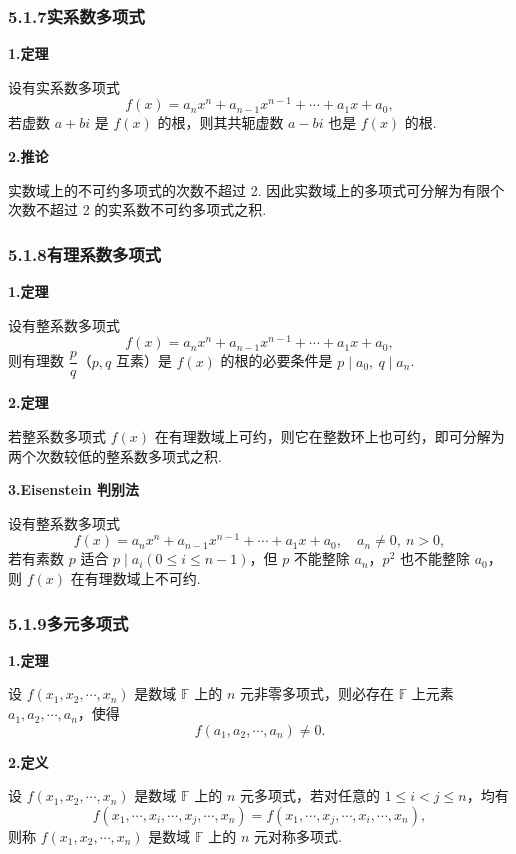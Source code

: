 \documentclass[UTF8, 12pt, fontset=fandol, oneside]{ctexart}
\begin{document}
\subsubsection*{5.1.7\quad 实系数多项式}

\noindent\textbf{1.\quad 定理}

设有实系数多项式
\[
f(x)=a_nx^n+a_{n-1}x^{n-1}+\cdots+a_1x+a_0,
\]
若虚数 $a+bi$ 是 $f(x)$ 的根，则其共轭虚数 $a-bi$ 也是 $f(x)$ 的根.

\noindent\textbf{2.\quad 推论}

实数域上的不可约多项式的次数不超过 2. 因此实数域上的多项式可分解为有限个次数不超过 2 的实系数不可约多项式之积.

\subsubsection*{5.1.8\quad 有理系数多项式}

\noindent\textbf{1.\quad 定理}

设有整系数多项式
\[
f(x)=a_nx^n+a_{n-1}x^{n-1}+\cdots+a_1x+a_0,
\]
则有理数 $\dfrac{p}{q}$（$p,q$ 互素）是 $f(x)$ 的根的必要条件是 $p\mid a_0,\ q\mid a_n$.

\noindent\textbf{2.\quad 定理}

若整系数多项式 $f(x)$ 在有理数域上可约，则它在整数环上也可约，即可分解为两个次数较低的整系数多项式之积.

\noindent\textbf{3.\quad Eisenstein 判别法}

设有整系数多项式
\[
f(x)=a_nx^n+a_{n-1}x^{n-1}+\cdots+a_1x+a_0,\quad a_n\ne0,\ n>0,
\]
若有素数 $p$ 适合 $p\mid a_i(0\le i\le n-1)$，但 $p$ 不能整除 $a_n$，$p^2$ 也不能整除 $a_0$，则 $f(x)$ 在有理数域上不可约.

\subsubsection*{5.1.9\quad 多元多项式}

\noindent\textbf{1.\quad 定理}

设 $f(x_1,x_2,\cdots,x_n)$ 是数域 $\mathbb{F}$ 上的 $n$ 元非零多项式，则必存在 $\mathbb{F}$ 上元素 $a_1,a_2,\cdots,a_n$，使得
\[
f(a_1,a_2,\cdots,a_n)\ne0.
\]

\noindent\textbf{2.\quad 定义}

设 $f(x_1,x_2,\cdots,x_n)$ 是数域 $\mathbb{F}$ 上的 $n$ 元多项式，若对任意的 $1\le i<j\le n$，均有
\[
f(x_1,\cdots,x_i,\cdots,x_j,\cdots,x_n)
=f(x_1,\cdots,x_j,\cdots,x_i,\cdots,x_n),
\]
则称 $f(x_1,x_2,\cdots,x_n)$ 是数域 $\mathbb{F}$ 上的 $n$ 元对称多项式.
\end{document}
